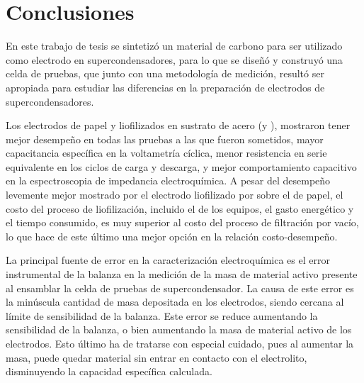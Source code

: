 \chapter{Conclusiones}
En este trabajo de tesis se sintetizó un material de carbono para ser utilizado como electrodo en supercondensadores, para lo que se diseñó y construyó una celda de pruebas, que junto con una metodología de medición, resultó ser apropiada para estudiar las diferencias en la preparación de electrodos de supercondensadores.

Los electrodos de papel y liofilizados en sustrato de acero (\mPapelAcero y \mLiofilizadoAcero), mostraron tener mejor desempeño en todas las pruebas a las que fueron sometidos, mayor capacitancia específica en la voltametría cíclica, menor resistencia en serie equivalente en los ciclos de carga y descarga, y mejor comportamiento capacitivo en la espectroscopia de impedancia electroquímica. A pesar del desempeño levemente mejor mostrado por el electrodo liofilizado por sobre el de papel, el costo del proceso de liofilización, incluido el de los equipos, el gasto energético y el tiempo consumido, es muy superior al costo del proceso de filtración por vacío, lo que hace de este último una mejor opción en la relación costo-desempeño.

La principal fuente de error en la caracterización electroquímica es el error instrumental de la balanza en la medición de la masa de material activo presente al ensamblar la celda de pruebas de supercondensador. La causa de este error es la minúscula cantidad de masa depositada en los electrodos, siendo cercana al límite de sensibilidad de la balanza. Este error se reduce aumentando la sensibilidad de la balanza, o bien aumentando la masa de material activo de los electrodos. Esto último ha de tratarse con especial cuidado, pues al aumentar la masa, puede quedar material sin entrar en contacto con el electrolito, disminuyendo la capacidad específica calculada. 